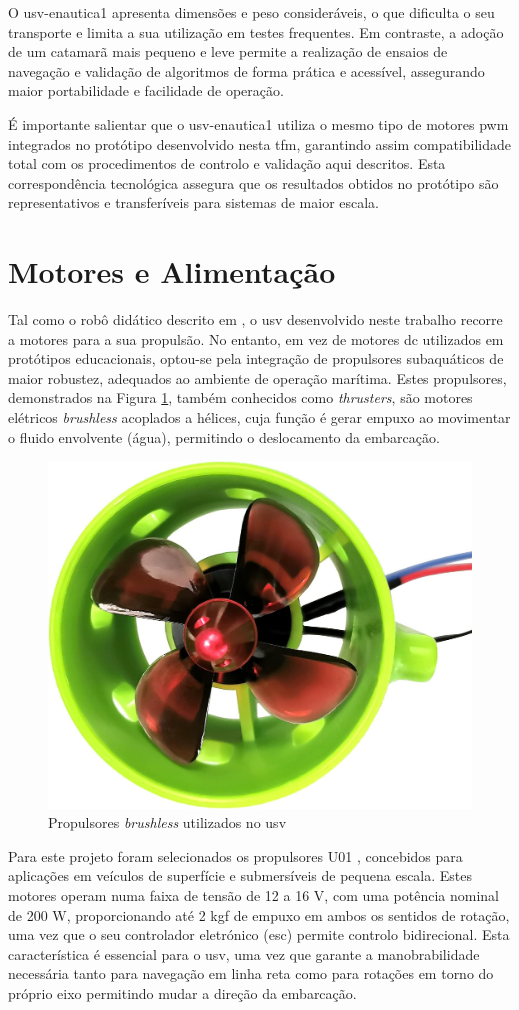 O \gls{usv}-enautica1 apresenta dimensões e peso consideráveis, o que dificulta o seu transporte e limita a sua utilização em testes frequentes. Em contraste, a adoção de um catamarã mais pequeno e leve permite a realização de ensaios de navegação e validação de algoritmos de forma prática e acessível, assegurando maior portabilidade e facilidade de operação.  

É importante salientar que o \gls{usv}-enautica1 utiliza o mesmo tipo de motores \gls{pwm} integrados no protótipo desenvolvido nesta \gls{tfm}, garantindo assim compatibilidade total com os procedimentos de controlo e validação aqui descritos. Esta correspondência tecnológica assegura que os resultados obtidos no protótipo são representativos e transferíveis para sistemas de maior escala.

\section{Motores e Alimentação}
\label{sec:motor}

Tal como o robô didático descrito em \cite{didactic-robot-thesis}, o \gls{usv} desenvolvido neste trabalho recorre a motores para a sua propulsão. No entanto, em vez de motores \gls{dc} utilizados em protótipos educacionais, optou-se pela integração de propulsores subaquáticos de maior robustez, adequados ao ambiente de operação marítima. Estes propulsores, demonstrados na Figura \ref{fig:thrusters}, também conhecidos como \emph{thrusters}, são motores elétricos \emph{brushless} acoplados a hélices, cuja função é gerar empuxo ao movimentar o fluido envolvente (água), permitindo o deslocamento da embarcação.

\begin{figure}[H]
    \centering
    \includegraphics[width=0.33\linewidth]{figuras/thrusters.jpg}
    \caption{Propulsores \emph{brushless} utilizados no \gls{usv}}
    \label{fig:thrusters}
\end{figure}

Para este projeto foram selecionados os propulsores U01 \cite{apisqueen-underwater-thruster}, concebidos para aplicações em veículos de superfície e submersíveis de pequena escala. Estes motores operam numa faixa de tensão de 12 a 16 V, com uma potência nominal de 200 W, proporcionando até 2 kgf de empuxo em ambos os sentidos de rotação, uma vez que o seu controlador eletrónico (\gls{esc}) permite controlo bidirecional. Esta característica é essencial para o \gls{usv}, uma vez que garante a manobrabilidade necessária tanto para navegação em linha reta como para rotações em torno do próprio eixo permitindo mudar a direção da embarcação.

